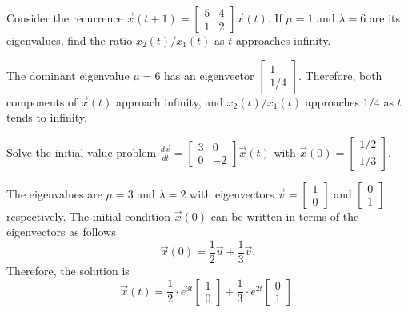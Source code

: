 \documentclass[../main.tex]{subfiles}
\begin{document}
\begin{exercise}
  Consider the recurrence \(\vec{x}(t+1) = \begin{bmatrix} 5 & 4 \\ 1 & 2\end{bmatrix} \vec{x}(t)\). If \(\mu = 1\) and \(\lambda = 6\) are its eigenvalues, find the ratio \(x_{2}(t) / x_{1}(t)\) as \(t\) approaches infinity.

  \begin{solution}
    The dominant eigenvalue \(\mu = 6\) has an eigenvector \(\begin{bmatrix} 1 \\ 1/4 \end{bmatrix}\). Therefore, both components of \(\vec{x}(t)\) approach infinity, and \(x_{2}(t)/x_{1}(t)\) approaches \(1/4\) as \(t\) tends to infinity.

  \end{solution}
\end{exercise}

\begin{exercise}
  Solve the initial-value problem \( \frac{d\vec{x}}{dt} = \begin{bmatrix} 3 & 0  \\ 0 & -2 \end{bmatrix} \vec{x}(t) \) with \(\vec{x}(0) = \begin{bmatrix} 1/2 \\ 1/3 \end{bmatrix}\).

  \begin{solution}
    The eigenvalues are \(\mu = 3\) and \(\lambda = 2\) with eigenvectors \(\vec{v} = \begin{bmatrix} 1 \\ 0 \end{bmatrix}\) and \(\begin{bmatrix} 0 \\ 1 \end{bmatrix}\) respectively.  The initial condition \(\vec{x}(0)\) can be written in terms of the eigenvectors as follows
    \[
      \vec{x}(0) = \frac{1}{2} \vec{u} + \frac{1}{3} \vec{v}.
    \]
    Therefore, the solution is
    \[
      \vec{x}(t) = \frac{1}{2} \cdot e^{3t} \begin{bmatrix} 1 \\ 0 \end{bmatrix} + \frac{1}{3} \cdot e^{2t} \begin{bmatrix} 0 \\ 1 \end{bmatrix}.
    \]

  \end{solution}
\end{exercise}
\end{document}
